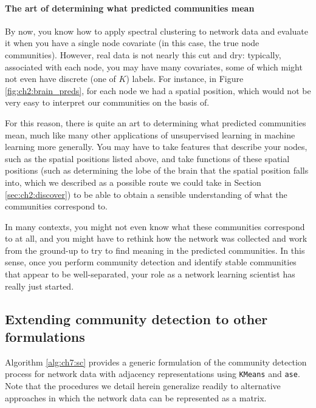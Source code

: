 \paragraph*{The art of determining what predicted communities mean}

By now, you know how to apply spectral clustering to network data and evaluate it when you have a single node covariate (in this case, the true node communities). However, real data is not nearly this cut and dry: typically, associated with each node, you may have many covariates, some of which might not even have discrete (one of $K$) labels. For instance, in Figure \ref{fig:ch2:brain_preds}, for each node we had a spatial position, which would not be very easy to interpret our communities on the basis of.

For this reason, there is quite an art to determining what predicted communities mean, much like many other applications of unsupervised learning in machine learning more generally. You may have to take features that describe your nodes, such as the spatial positions listed above, and take functions of these spatial positions (such as determining the lobe of the brain that the spatial position falls into, which we described as a possible route we could take in Section \ref{sec:ch2:discover}) to be able to obtain a sensible understanding of what the communities correspond to. 

In many contexts, you might not even know what these communities correspond to at all, and you might have to rethink how the network was collected and work from the ground-up to try to find meaning in the predicted communities. In this sense, once you perform community detection and identify stable communities that appear to be well-separated, your role as a network learning scientist has really just started.

\subsection{Extending community detection to other formulations}

Algorithm \ref{alg:ch7:sc} provides a generic formulation of the community detection process for network data with adjacency representations using \texttt{KMeans} and \texttt{ase}. Note that the procedures we detail herein generalize readily to alternative approaches in which the network data can be represented as a matrix. 

